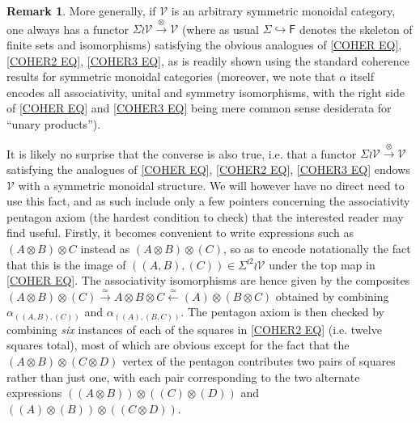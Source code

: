 \documentclass[a4paper,10pt
,draft
]{article}%
\numberwithin{equation}{section}
\numberwithin{figure}{section}
\theoremstyle{definition} %
\newtheorem{remark}[equation]{Remark}%
\newcommand{\Fin}{\mathsf{F}}%
\newcommand{\1}{\ensuremath{\mathbbm 1}}%
\begin{document}
\begin{remark}
\label{SIGMA_WR_REM}
More generally, if $\mathcal{V}$ is an arbitrary
symmetric monoidal category, one always has a functor 
$\Sigma \wr \mathcal{V} \xrightarrow{\otimes} \mathcal{V}$
(where as usual $\Sigma \hookrightarrow \Fin$ denotes the skeleton of finite sets and isomorphisms) satisfying the obvious analogues of
\eqref{COHER EQ}, \eqref{COHER2 EQ}, \eqref{COHER3 EQ},
as is readily shown using the standard coherence results for symmetric monoidal categories 
(moreover, we note that $\alpha$ itself encodes all associativity, unital and symmetry isomorphisms, with the 
right side of \eqref{COHER EQ} and \eqref{COHER3 EQ}
being mere common sense desiderata for ``unary products'').

It is likely no surprise that the converse is also true, i.e. 
that a functor 
$\Sigma \wr \mathcal{V} \xrightarrow{\otimes} \mathcal{V}$
satisfying the analogues of 
\eqref{COHER EQ}, \eqref{COHER2 EQ}, \eqref{COHER3 EQ}
endows $\mathcal{V}$ with a symmetric monoidal structure.
We will however have no direct need to use this fact, and as such include only a few pointers concerning the associativity pentagon axiom (the hardest condition to check) that the interested reader may find useful. 
Firstly, it becomes convenient to write expressions such as
$(A \otimes B) \otimes C$ instead as 
$(A \otimes B) \otimes (C)$, so as to encode notationally the fact that this is the image of 
$((A,B),(C)) \in \Sigma^{\wr 2} \wr \mathcal{V}$ under the top map in \eqref{COHER EQ}. The associativity isomorphisms are hence given by the composites
$
(A \otimes B) \otimes (C) \xrightarrow{\simeq} 
A \otimes B \otimes C \xleftarrow{\simeq}
(A) \otimes (B \otimes C)
$
obtained by combining 
$\alpha_{((A,B),(C))}$ 
and
$\alpha_{((A),(B,C))}$.
The pentagon axiom is then checked by combining \textit{six} instances of each of the squares in \eqref{COHER2 EQ} (i.e. twelve squares total), most of which are obvious except for the fact that the $(A\otimes B) \otimes (C \otimes D)$ vertex of the pentagon contributes two pairs of squares rather than just one, with each pair corresponding to the two alternate expressions 
$((A \otimes B)) \otimes ((C) \otimes (D))$ and 
$((A) \otimes (B)) \otimes ((C \otimes D))$.
\end{remark}

\end{document}
